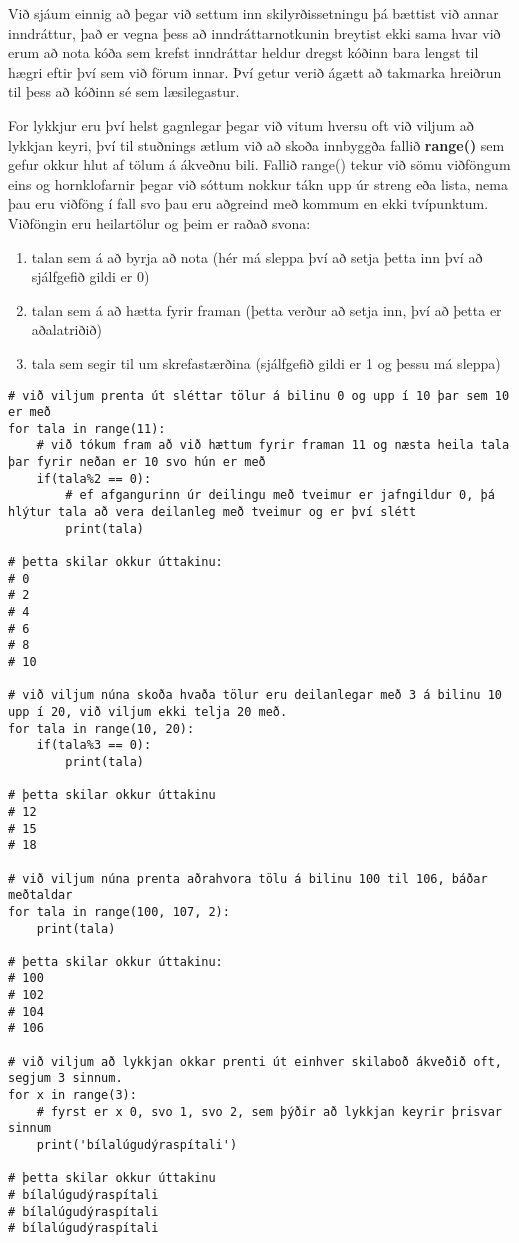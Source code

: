 Við sjáum einnig að þegar við settum inn skilyrðissetningu þá bættist við annar inndráttur, það er vegna þess að inndráttarnotkunin breytist ekki sama hvar við erum að nota kóða sem krefst inndráttar heldur dregst kóðinn bara lengst til hægri eftir því sem við förum innar. 
Því getur verið ágætt að takmarka hreiðrun til þess að kóðinn sé sem læsilegastur.

For lykkjur eru því helst gagnlegar þegar við vitum hversu oft við viljum að lykkjan keyri, því til stuðnings ætlum við að skoða innbyggða fallið \textbf{range()} sem gefur okkur hlut af tölum á ákveðnu bili.
Fallið range() tekur við sömu viðföngum eins og hornklofarnir þegar við sóttum nokkur tákn upp úr streng eða lista, nema þau eru viðföng í fall svo þau eru aðgreind með kommum en ekki tvípunktum.
Viðföngin eru heilartölur og þeim er raðað svona:

\begin{enumerate}
	\item talan sem á að byrja að nota (hér má sleppa því að setja þetta inn því að sjálfgefið gildi er 0)
	\item talan sem á að hætta fyrir framan (þetta verður að setja inn, því að þetta er aðalatriðið)
	\item tala sem segir til um skrefastærðina (sjálfgefið gildi er 1 og þessu má sleppa)
\end{enumerate}

\begin{lstlisting}[caption=range() fallið, label=lst:lykkjur-range]
# við viljum prenta út sléttar tölur á bilinu 0 og upp í 10 þar sem 10 er með
for tala in range(11):
	# við tókum fram að við hættum fyrir framan 11 og næsta heila tala þar fyrir neðan er 10 svo hún er með
	if(tala%2 == 0):
		# ef afgangurinn úr deilingu með tveimur er jafngildur 0, þá hlýtur tala að vera deilanleg með tveimur og er því slétt
		print(tala)
		
# þetta skilar okkur úttakinu:
# 0
# 2
# 4
# 6
# 8 
# 10

# við viljum núna skoða hvaða tölur eru deilanlegar með 3 á bilinu 10 upp í 20, við viljum ekki telja 20 með.
for tala in range(10, 20):
	if(tala%3 == 0):
		print(tala)

# þetta skilar okkur úttakinu
# 12
# 15
# 18

# við viljum núna prenta aðrahvora tölu á bilinu 100 til 106, báðar meðtaldar
for tala in range(100, 107, 2):
	print(tala)
	
# þetta skilar okkur úttakinu:
# 100
# 102
# 104
# 106

# við viljum að lykkjan okkar prenti út einhver skilaboð ákveðið oft, segjum 3 sinnum.
for x in range(3):
	# fyrst er x 0, svo 1, svo 2, sem þýðir að lykkjan keyrir þrisvar sinnum
	print('bílalúgudýraspítali')
	
# þetta skilar okkur úttakinu 
# bílalúgudýraspítali
# bílalúgudýraspítali
# bílalúgudýraspítali
\end{lstlisting}


